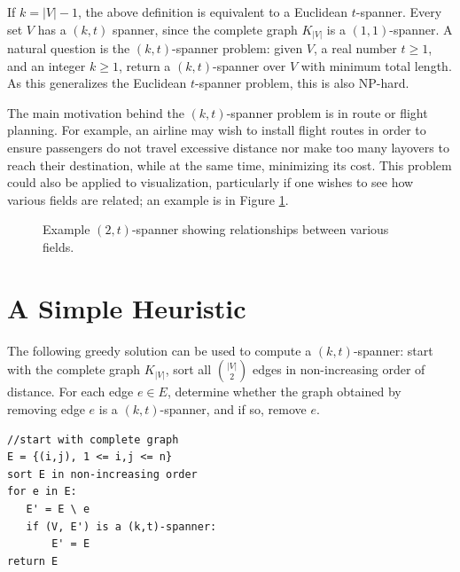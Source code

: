 \documentclass[12pt]{article}
\theoremstyle{definition}
\begin{document}
If $k = |V|-1$, the above definition is equivalent to a Euclidean $t$-spanner. Every set $V$ has a $(k,t)$ spanner, since the complete graph $K_{|V|}$ is a $(1,1)$-spanner. A natural question is the $(k,t)$-spanner problem: given $V$, a real number $t \ge 1$, and an integer $k \ge 1$, return a $(k,t)$-spanner over $V$ with minimum total length. As this generalizes the Euclidean $t$-spanner problem, this is also NP-hard.

The main motivation behind the $(k,t)$-spanner problem is in route or flight planning. For example, an airline may wish to install flight routes in order to ensure passengers do not travel excessive distance nor make too many layovers to reach their destination, while at the same time, minimizing its cost. This problem could also be applied to visualization, particularly if one wishes to see how various fields are related; an example is in Figure \ref{fig:fields}.

\begin{figure}[h]
\begin{center}
\end{center}
\caption{Example $(2,t)$-spanner showing relationships between various fields.}
\label{fig:fields}
\end{figure}

\section{A Simple Heuristic}
The following greedy solution can be used to compute a $(k,t)$-spanner: start with the complete graph $K_{|V|}$, sort all $\binom{|V|}{2}$ edges in non-increasing order of distance. For each edge $e \in E$, determine whether the graph obtained by removing edge $e$ is a $(k,t)$-spanner, and if so, remove $e$.

\begin{verbatim}
//start with complete graph
E = {(i,j), 1 <= i,j <= n}
sort E in non-increasing order
for e in E:
   E' = E \ e
   if (V, E') is a (k,t)-spanner:
       E' = E
return E
\end{verbatim}
\end{document}
